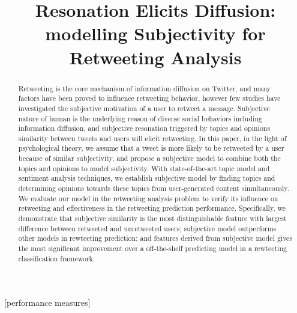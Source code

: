 \documentclass{acm_proc_article-sp}
\newcommand{\mo}[1]{\textcolor{red}{#1}}
\begin{document}
\title{Resonation Elicits Diffusion: modelling Subjectivity for Retweeting Analysis}

\maketitle
\begin{abstract}
Retweeting is the core mechanism of information diffusion on Twitter, and many factors have been proved to influence retweeting behavior, however few studies have investigated the subjective motivation of a user to retweet a message. 
Subjective nature of human is the underlying reason of diverse social behaviors including information diffusion, and subjective resonation triggered by topics and opinions similarity between tweets and users will elicit retweeting.
In this paper, in the light of psychological theory, we assume that a tweet is more likely to be retweeted by a user because of similar subjectivity, and propose a subjective model to combine both the topics and opinions to model subjectivity. 
With state-of-the-art topic model and sentiment analysis techniques, we establish subjective model by finding topics and determining opinions towards these topics from user-generated content simultaneously.
We evaluate our model in the retweeting analysis problem to verify its influence on retweeting and effectiveness in the retweeting prediction performance. 
Specifically, we demonstrate that subjective similarity is the most distinguishable feature with largest difference between retweeted and unretweeted users;
subjective model outperforms other models in rewteeting prediction; 
and features derived from subjective model gives the most significant improvement over a off-the-shelf predicting model in a rewteeting classification framework.
\end{abstract}
[performance measures]
\end{document}
